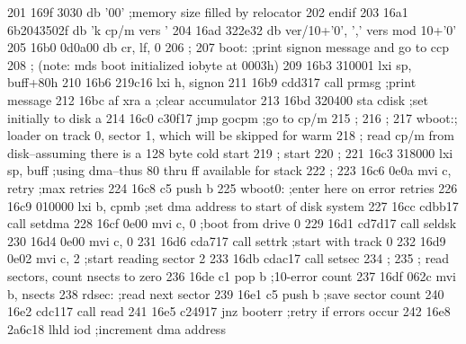 201      169f 3030                 db       '00'       ;memory size filled by relocator
202                                endif
203      16a1 6b2043502f           db       'k cp/m vers '
204      16ad 322e32               db       ver/10+'0', ',' vers mod 10+'0'
205      16b0 0d0a00               db       cr, lf, 0
206                       ;
207                       boot:    ;print signon message and go to ccp
208                       ;        (note: mds boot initialized iobyte at 0003h)
209      16b3 310001               lxi      sp, buff+80h
210      16b6 219c16               lxi      h, signon
211      16b9 cdd317               call     prmsg      ;print message
212      16bc af                   xra      a          ;clear accumulator
213      16bd 320400               sta      cdisk      ;set initially to disk a
214      16c0 c30f17               jmp      gocpm      ;go to cp/m
215                       ;
216                       ;
217                       wboot:;  loader on track 0, sector 1, which will be skipped for warm
218                       ;        read cp/m from disk--assuming there is a 128 byte cold start
219                       ;        start
220                       ;
221      16c3 318000               lxi      sp, buff   ;using dma--thus 80 thru ff available for stack
222                       ;
223      16c6 0e0a                 mvi      c, retry   ;max retries
224      16c8 c5                   push     b
225                       wboot0:  ;enter here on error retries
226      16c9 010000               lxi      b, cpmb    ;set dma address to start of disk system
227      16cc cdbb17               call     setdma
228      16cf 0e00                 mvi      c, 0       ;boot from drive 0
229      16d1 cd7d17               call     seldsk
230      16d4 0e00                 mvi      c, 0
231      16d6 cda717               call     settrk     ;start with track 0
232      16d9 0e02                 mvi      c, 2       ;start reading sector 2
233      16db cdac17               call     setsec
234                       ;
235                       ;        read sectors, count nsects to zero
236      16de c1                   pop      b          ;10-error count
237      16df 062c                 mvi      b, nsects
238                       rdsec:   ;read next sector
239      16e1 c5                   push     b          ;save sector count
240      16e2 cdc117               call     read
241      16e5 c24917               jnz      booterr    ;retry if errors occur
242      16e8 2a6c18               lhld     iod        ;increment dma address
